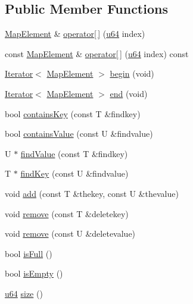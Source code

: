 \subsection*{Public Member Functions}
\begin{DoxyCompactItemize}
\item 
\hyperlink{classcrap_1_1container_1_1_map_a87121369de54f6650c8a84a0a19fab32}{Map\-Element} \& \hyperlink{classcrap_1_1container_1_1_map_acdc514785ee32d6e0044f16756354a47}{operator\mbox{[}$\,$\mbox{]}} (\hyperlink{types_8h_a3f7e2bcbb0b4c338f3c4f6c937cd4234}{u64} index)
\item 
const \hyperlink{classcrap_1_1container_1_1_map_a87121369de54f6650c8a84a0a19fab32}{Map\-Element} \& \hyperlink{classcrap_1_1container_1_1_map_ac35870054de6a0137728f9012d7c59aa}{operator\mbox{[}$\,$\mbox{]}} (\hyperlink{types_8h_a3f7e2bcbb0b4c338f3c4f6c937cd4234}{u64} index) const
\item 
\hyperlink{class_iterator}{Iterator}$<$ \hyperlink{classcrap_1_1container_1_1_map_a87121369de54f6650c8a84a0a19fab32}{Map\-Element} $>$ \hyperlink{classcrap_1_1container_1_1_map_ae7cc145818348772ff62cc0adae32bb4}{begin} (void)
\item 
\hyperlink{class_iterator}{Iterator}$<$ \hyperlink{classcrap_1_1container_1_1_map_a87121369de54f6650c8a84a0a19fab32}{Map\-Element} $>$ \hyperlink{classcrap_1_1container_1_1_map_a90907bcb7668c9f3f2f6506ade64416c}{end} (void)
\item 
bool \hyperlink{classcrap_1_1container_1_1_map_ad1eb2083895604cb51820cad9837b6ee}{contains\-Key} (const T \&findkey)
\item 
bool \hyperlink{classcrap_1_1container_1_1_map_a50f1cc76a8f4bb831985a3fcdecb40f1}{contains\-Value} (const U \&findvalue)
\item 
U $\ast$ \hyperlink{classcrap_1_1container_1_1_map_af1452bbe558248c670745aaee6bfb4af}{find\-Value} (const T \&findkey)
\item 
T $\ast$ \hyperlink{classcrap_1_1container_1_1_map_a01688dc842e02174c2a80cfa771e7fa2}{find\-Key} (const U \&findvalue)
\item 
void \hyperlink{classcrap_1_1container_1_1_map_a5d89f55e1783f994d2d4da75f4f49f01}{add} (const T \&thekey, const U \&thevalue)
\item 
void \hyperlink{classcrap_1_1container_1_1_map_a89d2a56707c2a9dba368bf78ae8f05e0}{remove} (const T \&deletekey)
\item 
void \hyperlink{classcrap_1_1container_1_1_map_aedf1f6e873cfc1d27aab283ba82d6381}{remove} (const U \&deletevalue)
\item 
bool \hyperlink{classcrap_1_1container_1_1_map_aa3c393314145f117b7e1896eb2087675}{is\-Full} ()
\item 
bool \hyperlink{classcrap_1_1container_1_1_map_adc0c60f190eb25018e145e5f3ae30615}{is\-Empty} ()
\item 
\hyperlink{types_8h_a3f7e2bcbb0b4c338f3c4f6c937cd4234}{u64} \hyperlink{classcrap_1_1container_1_1_map_a6194f89da172bea47b527b7bba99b644}{size} ()
\end{DoxyCompactItemize}


